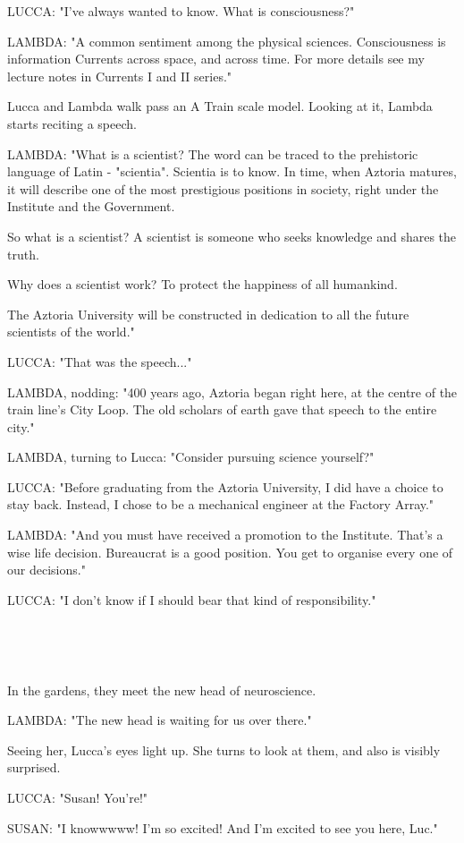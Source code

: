 \documentclass[11pt]{article}
\begin{document}
LUCCA: "I've always wanted to know. 
What is consciousness?"

LAMBDA: "A common sentiment among the physical sciences.
Consciousness is information Currents across space, and across time.
For more details see my lecture notes in Currents I and II series."

Lucca and Lambda walk pass an A Train scale model.
Looking at it, Lambda starts reciting a speech.

LAMBDA: "What is a scientist? 
The word can be traced to the prehistoric language of Latin - "scientia". 
Scientia is to know. 
In time, when Aztoria matures, it will describe one of the most prestigious positions in society, right under the Institute and the Government. 

So what is a scientist? 
A scientist is someone who seeks knowledge and shares the truth. 

Why does a scientist work?
To protect the happiness of all humankind.

The Aztoria University will be constructed in dedication to all the future scientists of the world."

LUCCA: "That was the speech..."

LAMBDA, nodding: "400 years ago, Aztoria began right here, at the centre of the train line's City Loop. 
The old scholars of earth gave that speech to the entire city."

LAMBDA, turning to Lucca: "Consider pursuing science yourself?"

LUCCA: "Before graduating from the Aztoria University, I did have a choice to stay back. 
Instead, I chose to be a mechanical engineer at the Factory Array."

LAMBDA: "And you must have received a promotion to the Institute.
That's a wise life decision.
Bureaucrat is a good position.
You get to organise every one of our decisions."

LUCCA: "I don't know if I should bear that kind of responsibility."

\ 

\ 

In the gardens, they meet the new head of neuroscience.

LAMBDA: "The new head is waiting for us over there."

Seeing her, Lucca's eyes light up.
She turns to look at them, and also is visibly surprised.

LUCCA: "Susan! You're!"

SUSAN: "I knowwwww! I'm so excited! And I'm excited to see you here, Luc."
\end{document}
